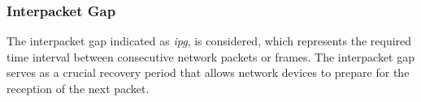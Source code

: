 



    \subsubsection{Interpacket Gap}


    The interpacket gap indicated as \textit{ipg}, is considered, which represents the required time interval between consecutive network packets or frames. The interpacket gap serves as a crucial recovery period that allows network devices to prepare for the reception of the next packet.

